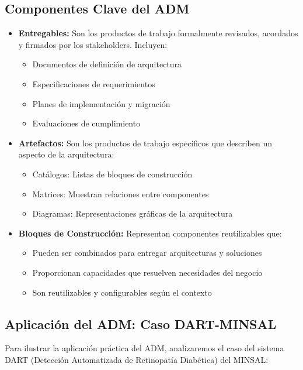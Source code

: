 \subsection{Componentes Clave del ADM}
\begin{itemize}
\item \textbf{Entregables:} Son los productos de trabajo formalmente revisados, acordados y firmados por los stakeholders. Incluyen:
  \begin{itemize}
    \item Documentos de definición de arquitectura
    \item Especificaciones de requerimientos
    \item Planes de implementación y migración
    \item Evaluaciones de cumplimiento
  \end{itemize}

\item \textbf{Artefactos:} Son los productos de trabajo específicos que describen un aspecto de la arquitectura:
  \begin{itemize}
    \item Catálogos: Listas de bloques de construcción
    \item Matrices: Muestran relaciones entre componentes
    \item Diagramas: Representaciones gráficas de la arquitectura
  \end{itemize}

\item \textbf{Bloques de Construcción:} Representan componentes reutilizables que:
  \begin{itemize}
    \item Pueden ser combinados para entregar arquitecturas y soluciones
    \item Proporcionan capacidades que resuelven necesidades del negocio
    \item Son reutilizables y configurables según el contexto
  \end{itemize}
\end{itemize}

\subsection{Aplicación del ADM: Caso DART-MINSAL}

Para ilustrar la aplicación práctica del ADM, analizaremos el caso del sistema DART (Detección Automatizada de Retinopatía Diabética) del MINSAL:

